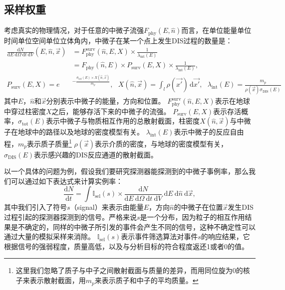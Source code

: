 \subsection{采样权重}
\label{subsec:weightings}

考虑真实的物理情况，对于任意的中微子流强$F_\mathrm{phy}(E, \hat{n})$而言，在单位能量单位时间单位空间单位立体角内，中微子在某一个点上发生DIS过程的数量是：
\begin{equation}
\begin{aligned}
    \frac{\mathrm{d}N}{\mathrm{d}E ~\mathrm{d}\Omega ~\mathrm{d}t ~\mathrm{d}V} (E, \hat{n}, \vec{x})
    &= F_\mathrm{phy}^\mathrm{surv} (\hat{n}, E, X)\times \frac{1}{\lambda_\mathrm{int}(E)} \\
    &= F_\mathrm{phy}(\hat{n}, E) \times P_\mathrm{surv}(E, X) \times \frac{1}{\lambda_\mathrm{int}(E)} , \\
    P_\mathrm{surv}(E, X) = e&^{- \frac{\sigma_\mathrm{tot}(E) \times X(\hat{n}, \vec{x})}{m_{p}}}, ~~~
    X(\hat{n}, \vec{x}) = \int_l \rho(\vec{x'}) \,\mathrm{d}\vec{x'}, ~~~
    \lambda_\mathrm{int}(E) = \frac{m_{p}}{\rho(\vec{x}) \sigma_\mathrm{DIS}(E)}
\end{aligned}
\label{eq:sampling_phy_pdf}
\end{equation}
其中$E$，$\hat{n}$和$\vec{x}$分别表示中微子的能量，方向和位置。
$F_\mathrm{phy}^\mathrm{surv} (\hat{n}, E, X)$表示在地球中穿过柱密度$X$之后，能够存活下来的中微子的流强。
$P_\mathrm{surv}(E, X)$表示存活概率，$\sigma_\mathrm{tot}(E)$表示中微子与物质相互作用的总散射截面，柱密度$X(\hat{n}, \vec{x})$与中微子在地球中的路径以及地球的密度模型有关。
$\lambda_\mathrm{int}(E)$表示中微子的反应自由程，$m_p$表示质子质量\footnote{这里我们忽略了质子与中子之间散射截面与质量的差异，而用同位旋为0的核子来表示散射截面，用$m_p$来表示质子和中子的平均质量。}
$\rho(\vec{x})$表示介质的密度，与地球的密度模型有关，$\sigma_\mathrm{DIS}(E)$表示感兴趣的DIS反应通道的散射截面。

以一个具体的问题为例，假设我们要研究探测器能探测到的中微子事例率，那么我们可以通过如下表达式来计算实例率：
\begin{equation}
    \frac{\mathrm{d}N}{\mathrm{d}t} = 
    \int \mathbb{I}_\mathrm{sel}(s) \times \frac{\mathrm{d}N}{\mathrm{d}E ~\mathrm{d}\Omega ~\mathrm{d}t ~\mathrm{d}V} 
    ~\mathrm{d}E ~\mathrm{d}\hat{n} ~\mathrm{d}\vec{x} ,
    \label{eq:sampling_phy_trigger}
\end{equation}
其中我们引入了符号$s$（signal）来表示由能量$E$，方向$\hat{n}$的中微子在位置$\vec{x}$发生DIS过程引起的探测器探测到的信号。严格来说$s$是一个分布，因为粒子的相互作用结果是不确定的，同样的中微子所引发的事件会产生不同的信号，这种不确定性可以通过大量的模拟采样来消除。
$\mathbb{I}_\mathrm{sel}(s)$表示事件筛选算法对事件$s$的响应结果，它根据信号的强弱程度，质量高低，以及与分析目标的符合程度返还1或者0的值。

